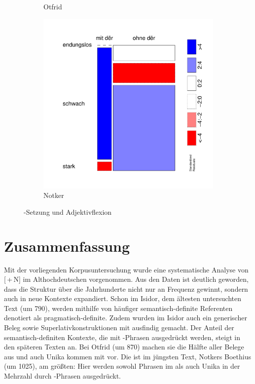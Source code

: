 \begin{figure}
\begin{subfigure}[b]{.5\linewidth}
\caption {Otfrid}
\end{subfigure}
\begin{subfigure}[b]{.5\linewidth}
  \includegraphics[height=.25\textheight]{generated/images/adjektive-N}
\caption {Notker}
\end{subfigure}
\caption{-Setzung und Adjektivflexion}
\label{fig:ther-adj}
\end{figure}

\section{Zusammenfassung}

Mit der vorliegenden Korpusuntersuchung   wurde eine systematische Analyse von [\,+\,N] im Althochdeutschen vorgenommen. Aus den Daten ist deutlich geworden, dass die Struktur über die Jahrhunderte nicht nur an Frequenz gewinnt, sondern auch in neue Kontexte expandiert. Schon im Isidor, dem ältesten untersuchten Text (um 790), werden mithilfe von  häufiger semantisch-definite  Referenten denotiert als  pragmatisch-definite. Zudem wurden im Isidor auch ein generischer   Beleg sowie Superlativkonstruktionen  mit  ausfindig gemacht. Der Anteil der semantisch-definiten  Kontexte, die mit -Phrasen  ausgedrückt werden, steigt in den späteren Texten an. Bei Otfrid (um 870) machen sie die Hälfte aller Belege aus und auch Unika  kommen mit  vor. Die  ist im jüngsten Text, Notkers Boethius (um 1025), am größten: Hier werden sowohl Phrasen im  als auch Unika  in der Mehrzahl durch -Phrasen  ausgedrückt.

